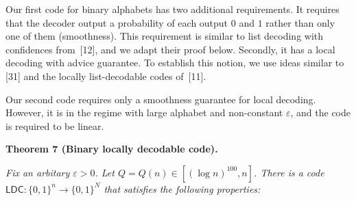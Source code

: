 \documentclass[10pt,a4paper]{article}
\begin{document}
Our first code for binary alphabets has two additional requirements. It requires that the decoder output a probability of each output $0$ and $1$ rather than only one of them (smoothness). This requirement is similar to list decoding with confidences from [12], and we adapt their proof below. Secondly, it has a local decoding with advice guarantee. To establish this notion, we use ideas similar to [31] and the locally list-decodable codes of [11].\par




Our second code requires only a smoothness guarantee for local decoding. However, it is in the regime with large alphabet and non-constant $\varepsilon$, and the code is required to be linear.\par





\par\medskip\noindent\textbf{
\textbf{Theorem 7}\textbf{ }(Binary locally decodable code)\textbf{.}
}\par



\emph{Fix an arbitary $\varepsilon>0$. Let $Q=Q(n)\in[(\log n)^{100},n]$. There is a code $\mathsf{LDC}:\{0,1\}^{n}\rightarrow\{0,1\}^{N}$
that satisfies the following properties:}\par
\end{document}
